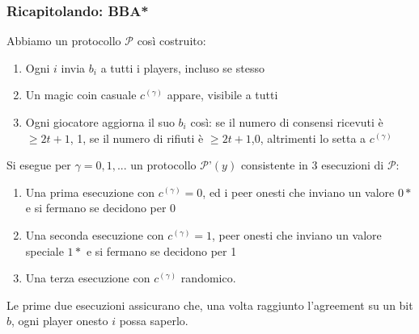 \documentclass[11pt]{article}
\begin{document}
\subsubsection{Ricapitolando: BBA*}
Abbiamo un protocollo $\mathcal{P}$ così costruito:
\begin{enumerate}
    \item Ogni $i$ invia $b_i$ a tutti i players, incluso se stesso
    \item Un magic coin casuale $c^{(\gamma)}$ appare, visibile a tutti
    \item Ogni giocatore aggiorna il suo $b_i$ così: se il numero di consensi ricevuti è $\ge 2t+1$, 1, se il numero di rifiuti è $\ge 2t+1$,0, altrimenti lo setta a $c^{(\gamma)}$
\end{enumerate}
Si esegue per $\gamma=0,1,...$ un protocollo $\mathcal{P}$'$(y)$ consistente in 3 esecuzioni di $\mathcal{P}$:
\begin{enumerate}
    \item Una prima esecuzione con $c^{(\gamma)}=0$, ed i peer onesti che inviano un valore $0*$ e si fermano se decidono per 0
    \item Una seconda esecuzione con $c^{(\gamma)}=1$, peer onesti che inviano un valore speciale $1*$ e si fermano se decidono per 1
    \item Una terza esecuzione con $c^{(\gamma)}$ randomico.
\end{enumerate}
Le prime due esecuzioni assicurano che, una volta raggiunto l'agreement su un bit $b$, ogni player onesto $i$ possa saperlo. 
\end{document}
